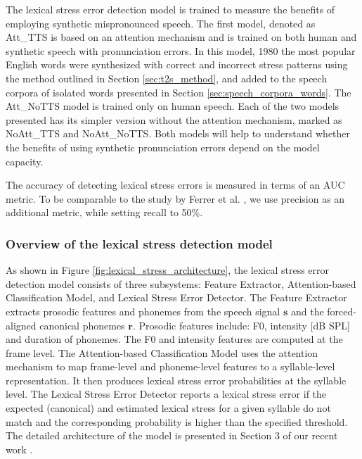 \documentclass[]{interact}
\theoremstyle{plain}%
\theoremstyle{definition}
\theoremstyle{remark}
\begin{document}
The lexical stress error detection model is trained to measure the benefits of employing synthetic mispronounced speech. The first model, denoted as Att\_TTS is based on an attention mechanism and is trained on both human and synthetic speech with pronunciation errors. In this model, 1980 the most popular English words \cite{michel2011quantitative} were synthesized with correct and incorrect stress patterns using the method outlined in Section \ref{sec:t2s_method}, and added to the speech corpora of isolated words presented in  Section \ref{sec:speech_corpora_words}. The Att\_NoTTS model is trained only on human speech. Each of the two models presented has its simpler version without the attention mechanism, marked as NoAtt\_TTS and NoAtt\_NoTTS. Both models will help to understand whether the benefits of using synthetic pronunciation errors depend on the model capacity.

The accuracy of detecting lexical stress errors is measured in terms of an AUC metric. To be comparable to the study by Ferrer et al. \cite{ferrer2015classification}, we use precision as an additional metric, while setting recall to 50\%.

\subsubsection{Overview of the lexical stress detection model}

As shown in Figure \ref{fig:lexical_stress_architecture}, the lexical stress error detection model consists of three subsystems: Feature Extractor, Attention-based Classification Model, and Lexical Stress Error Detector. The Feature Extractor extracts prosodic features and phonemes from the speech signal $\mathbf{s}$ and the forced-aligned canonical phonemes $\mathbf{r}$. Prosodic features include: F0, intensity [dB SPL] and duration of phonemes. The F0 and intensity features are computed at the frame level. The Attention-based Classification Model uses the attention mechanism \cite{vaswani2017attention} to map frame-level and phoneme-level features to a syllable-level representation. It then produces lexical stress error probabilities at the syllable level. The Lexical Stress Error Detector reports a lexical stress error if the expected (canonical) and estimated lexical stress for a given syllable do not match and the corresponding probability is higher than the specified threshold. The detailed architecture of the model is presented in Section 3 of our recent work \cite{korzekwa21_interspeech}.
\end{document}
